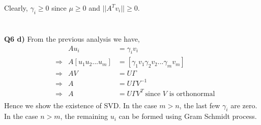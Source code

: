 \documentclass[11pt]{article}
\begin{document}
Clearly, $\gamma_i \geq 0$ since $\mu \geq 0$ and $||A^Tv_i|| \geq 0$.\\\\\\
\textbf{Q6 d)} From the previous analysis we have,
\begin{align*}
&& Au_i &=  \gamma_iv_i\\
&\Rightarrow & A[u_1 u_2 ... u_m] &=  [\gamma_1v_1 \gamma_2v_2 ... \gamma_mv_m]\\
&\Rightarrow & AV &=  U \Gamma \\
&\Rightarrow & A &=  U \Gamma V^{-1}\\
&\Rightarrow & A &=  U \Gamma V^{T}~\text{since $V$ is orthonormal}\\
\end{align*}
Hence we show the existence of SVD. In the case $m > n$, the last few $\gamma_i$ are zero. In the case $n > m$, the remaining $u_i$ can be formed using Gram Schmidt process.
\end{document}
